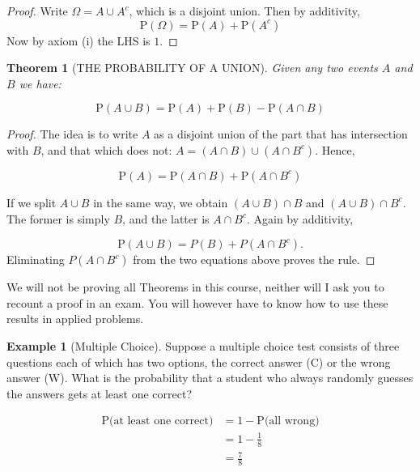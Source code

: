 \documentclass[
]{book}
\newtheorem{theorem}{Theorem}[chapter]
\theoremstyle{definition}
\theoremstyle{definition}
\newtheorem{example}{Example}[chapter]
\theoremstyle{definition}
\theoremstyle{definition}
\theoremstyle{remark}
\begin{document}
\begin{proof}
Write \(\Omega = A \cup A^{c}\), which is a disjoint union. Then by additivity,
\[\text{P}(\Omega) = \text{P}(A) + \text{P}(A^{c}) \]
Now by axiom (i) the LHS is \(1\).
\end{proof}

\begin{theorem}[THE PROBABILITY OF A UNION]
\protect\hypertarget{thm:sum}{}\label{thm:sum}Given any two events \(A\) and \(B\) we have:

\[\text{P}(A\cup B) = \text{P}(A) + \text{P}(B) - \text{P}(A \cap B)\]
\end{theorem}

\begin{proof}
The idea is to write \(A\) as a disjoint union of the part that has intersection with \(B\), and that which does not: \(A=(A\cap B)\cup(A\cap B^{c})\). Hence,

\[\text{P}(A) = \text{P}(A\cap B) + \text{P}(A\cap B^{c})\]

If we split \(A\cup B\) in the same way, we obtain \((A\cup B)\cap B\) and \((A\cup B)\cap B^{c}\). The former is simply \(B\), and the latter is \(A \cap B^{c}\). Again by additivity,

\[\text{P}(A \cup B) = P(B) + P(A\cap B^{c}).\]
Eliminating \(P(A\cap B^{c})\) from the two equations above proves the rule.
\end{proof}

We will not be proving all Theorems in this course, neither will I ask you to recount a proof in an exam. You will however have to know how to use these results in applied problems.

\begin{example}[Multiple Choice]
Suppose a multiple choice test consists of three questions each of which has two options, the correct answer (C) or the wrong answer (W). What is the probability that a student who always randomly guesses the answers gets at least one correct?

\begin{align}
\text{P(at least one correct)} &= 1 - \text{P(all wrong)} \\
&= 1- \frac{1}{8}  \\
&=\frac{7}{8}
\end{align}
\end{example}
\end{document}
